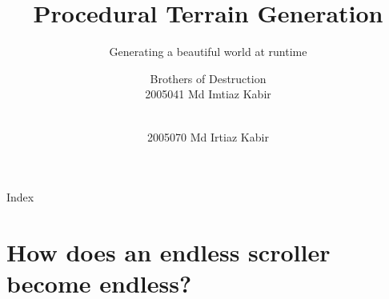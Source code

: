 

\title{Procedural Terrain Generation}
\subtitle{Generating a beautiful world at runtime}
\author{\large Brothers of Destruction \\
2005041 Md Imtiaz Kabir \and \\
2005070 Md Irtiaz Kabir}



\begin{frame}
  \titlepage
\end{frame}

\begin{frame}{Index}
  \vspace{0.5cm}
  \tableofcontents
\end{frame}

\section{How does an endless scroller become endless?}

